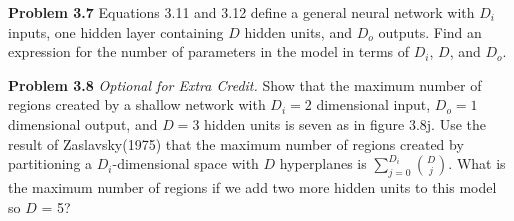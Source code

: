 \documentclass[11pt, oneside]{article}   	%
\begin{document}
\vspace{1cm}

\textbf{Problem 3.7} Equations 3.11 and 3.12 define a general neural network
with \(D_i\) inputs, one hidden layer containing \(D\) hidden units, and
\(D_o\) outputs. Find an expression for the number of parameters in the
model in terms of \(D_i\), \(D\), and \(D_o\).

\vspace{1cm}

\textbf{Problem 3.8} \textit{Optional for Extra Credit.} 
Show that the maximum number of regions created by a shallow network 
with \(D_i = 2\) dimensional input, \(D_o = 1\) dimensional output, 
and \(D = 3\) hidden units is seven as in figure 3.8j. Use the result of 
Zaslavsky(1975) that the maximum number of regions created by 
partitioning a \(D_i\)-dimensional space with \(D\) hyperplanes 
is \(\sum_{j=0}^{D_i} \binom{D}{j} \). 
What is the maximum number of regions if we add two more hidden 
units to this model so \(D\) = 5?
\end{document}
